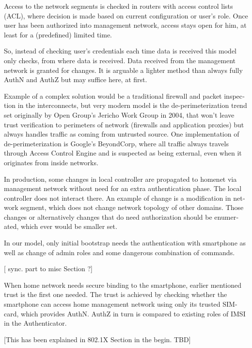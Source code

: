 \documentclass[12pt,a4paper,english]{tutthesis}
\begin{document}
\begin{otherlanguage}{english}
Access to the network segments is checked in routers with access control lists
(ACL), where decision is made based on current configuration or user's
role.  Once user has been authorized into management network, access
stays open for him, at least for a (predefined) limited time.

So, instead of checking user's credentials each time data is received
this model only checks, from where data is received. 
Data received from the management network is granted for changes.
It is arguable a lighter method than always
fully AuthN and AuthZ but may suffice here, at first.



Example of a complex solution would be a traditional firewall and packet
inspection in the interconnects, but very modern model
is the de-perimeterization trend set originally by Open Group's
Jericho Work Group in 2004, that won't leave trust verification to
perimeters of network (firewalls and application proxies) but 
always handles traffic as coming from untrusted source.\cite{jericho2004}
One implementation of de-perimeterization is 
Google's BeyondCorp\cite{2014-beyondcorp}, 
where all traffic always travels through Access Control Engine
and is suspected as being external, even when it originates from
inside networks. 


In production, some changes in local controller are propagated to homenet
via management network without need for an extra authentication phase.
The local controller does not interact there. An example of change is
a modification in network segment, which does not change network topology of other domains.
Those changes or alternatively changes that do need authorization
should be enumerated, which ever would be smaller set.  

In our model, only initial bootstrap needs the authentication with
smartphone as well as change of admin roles and some dangerous
combination of commands.

[ sync. part to misc Section ?]





When home network needs secure binding to the smartphone, earlier
mentioned trust is the first one needed.  The trust is achieved by
checking whether the smartphone can access home management
network using only its trusted SIM-card, which provides AuthN. AuthZ in
turn is compared to existing roles of IMSI in the Authenticator.


[This has been explained in 802.1X Section in the begin. TBD]


\end{otherlanguage}
\end{document}
